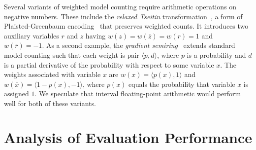 \documentclass[letterpaper,USenglish,cleveref, autoref, thm-restate]{lipics-v2021}
\newcommand{\obar}[1]{\overline{#1}}
\begin{document}
Several variants of weighted model counting require
arithmetic operations on negative numbers.  These
include the \emph{relaxed Tseitin}
transformation~\cite{meert:starai:2016},  a form
of Plaisted-Green\-baum encoding~\cite{plaisted:jsc:1986} that preserves
weighted counts.  It introduces two auxiliary variables $r$ and $z$ having
$w(z) = w(\obar{z}) = w(r) = 1$ and $w(\obar{r}) = -1$.
As a second example, the \emph{gradient
semiring}~\cite{eisner:acl:2002,kimmig:jal:2017,maene:aaai:2025} extends standard
model counting such that each weight is pair $\langle p, d \rangle$,
where $p$ is a probability and $d$ is a partial derivative of the
probability with respect to some variable $x$.  The weights
associated with variable $x$ are $w(x) = \langle p(x), 1\rangle$ and
$w(\obar{x}) = \langle 1-p(x), -1\rangle$, where $p(x)$ equals the probability that variable $x$ is assigned $1$.
We speculate that interval floating-point arithmetic would perform well for both of these variants.



\newpage


\newpage
\appendix

\section{Analysis of Evaluation Performance}
\label{app:performance}
\end{document}
